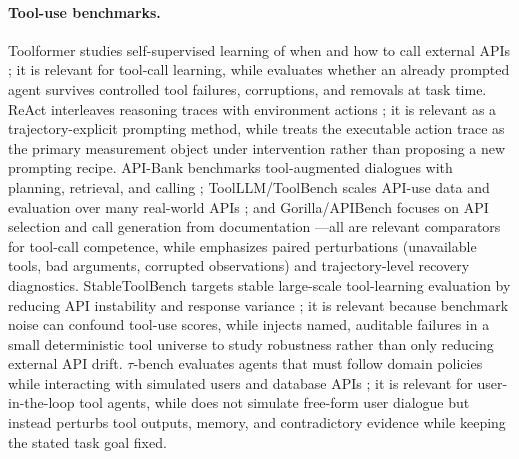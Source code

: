 \paragraph{Tool-use benchmarks.}
Toolformer studies self-supervised learning of when and how to call external APIs \citep{schick2023toolformerlanguagemodelsteach}; it is relevant for tool-call learning, while \CAB{} evaluates whether an already prompted agent survives controlled tool failures, corruptions, and removals at task time.
ReAct interleaves reasoning traces with environment actions \citep{yao2023reactsynergizingreasoningacting}; it is relevant as a trajectory-explicit prompting method, while \CAB{} treats the executable action trace as the primary measurement object under intervention rather than proposing a new prompting recipe.
API-Bank benchmarks tool-augmented dialogues with planning, retrieval, and calling \citep{li2023apibankcomprehensivebenchmarktoolaugmented}; ToolLLM/ToolBench scales API-use data and evaluation over many real-world APIs \citep{qin2023toolllmfacilitatinglargelanguage}; and Gorilla/APIBench focuses on API selection and call generation from documentation \citep{patil2023gorillalargelanguagemodel}---all are relevant comparators for tool-call competence, while \CAB{} emphasizes paired perturbations (unavailable tools, bad arguments, corrupted observations) and trajectory-level recovery diagnostics.
StableToolBench targets stable large-scale tool-learning evaluation by reducing API instability and response variance \citep{guo2024stabletoolbenchstablelarge}; it is relevant because benchmark noise can confound tool-use scores, while \CAB{} injects named, auditable failures in a small deterministic tool universe to study robustness rather than only reducing external API drift.
$\tau$-bench evaluates agents that must follow domain policies while interacting with simulated users and database APIs \citep{yao2024taubenchtoolagentuser}; it is relevant for user-in-the-loop tool agents, while \CAB{} does not simulate free-form user dialogue but instead perturbs tool outputs, memory, and contradictory evidence while keeping the stated task goal fixed.

